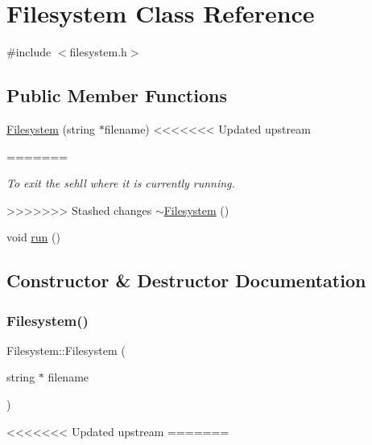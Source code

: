 \hypertarget{class_filesystem}{}\section{Filesystem Class Reference}
\label{class_filesystem}


{\ttfamily \#include $<$filesystem.\+h$>$}

\subsection*{Public Member Functions}
\begin{DoxyCompactItemize}
\item 
\hyperlink{class_filesystem_aac89cbe467cc517e80049e0277812040}{Filesystem} (string $\ast$filename)
<<<<<<< Updated upstream
\item 
=======
\begin{DoxyCompactList}\small\item\em To exit the sehll where it is currently running. \end{DoxyCompactList}\item 
>>>>>>> Stashed changes
\hyperlink{class_filesystem_a8d4d73d3d4e56fd6792bdb83f6c5dfd8}{$\sim$\+Filesystem} ()
\item 
void \hyperlink{class_filesystem_a373c34da491ec8d269cbc18d52a1ad79}{run} ()
\end{DoxyCompactItemize}


\subsection{Constructor \& Destructor Documentation}
\mbox{\label{class_filesystem_aac89cbe467cc517e80049e0277812040}} 
\subsubsection{\texorpdfstring{Filesystem()}{Filesystem()}}
{\footnotesize\ttfamily Filesystem\+::\+Filesystem (\begin{DoxyParamCaption}\item[{string $\ast$}]{filename }\end{DoxyParamCaption})\hspace{0.3cm}{\ttfamily [inline]}}

<<<<<<< Updated upstream
=======


